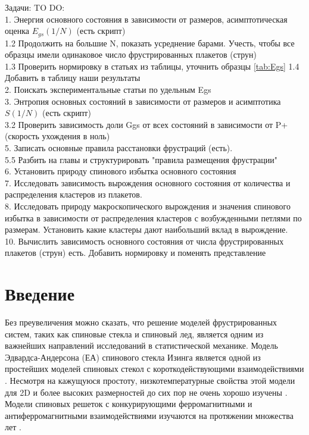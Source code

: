 \documentclass[utf8, babel, sor, jor, amsmath, amssymb, reprint]{elsarticle} %
\begin{document}
\linenumbers
\newpage
Задачи:
TO DO: \\
1. Энергия основного состояния в зависимости от размеров, асимптотическая оценка $E_{gs}(1/N)$ (есть скрипт)\\
1.2 Продолжить на большие N, показать усреднение барами. Учесть, чтобы все образцы имели одинаковое число фрустрированных плакетов (струн) \\
1.3 Проверить нормировку в статьях из таблицы, уточнить образцы \ref{tab:Egs}
1.4 Добавить в таблицу наши результаты\\
2. Поискать экспериментальные статьи по удельным Egs\\
3. Энтропия основных состояний в зависимости от размеров и асимптотика $S(1/N)$  (есть скрипт)\\
3.2 Проверить зависимость доли Ggs от всех состояний в зависимости от P+ (скорость ухождения в ноль)\\
5. Записать основные правила расстановки фрустраций (есть).\\
5.5 Разбить на главы и структурировать "правила размещения фрустрации"\\
6. Установить природу спинового избытка основного состояния \\
7. Исследовать зависимость вырождения основного состояния от количества и распределения кластеров из плакетов.\\
8. Исследовать природу макроскопического вырождения и значения спинового избытка в зависимости от распределения кластеров с возбужденными петлями по размерам. Установить какие кластеры дают наибольший вклад в вырождение. \\
10. Вычислить зависимость основного состояния от числа фрустрированных плакетов (струн) есть. Добавить нормировку и поменять представление\\
\newpage



\tableofcontents

\newpage
\section{Введение}

Без преувеличения можно сказать, что решение моделей фрустрированных систем, таких как спиновые стекла и спиновый лед, является одним из важнейших направлений исследований в статистической механике. Модель Эдвардса-Андерсона (ЕА) спинового стекла Изинга является одной из простейших моделей спиновых стекол с короткодействующими взаимодействиями \cite{edwards1975theory}. Несмотря на кажущуюся простоту, низкотемпературные свойства этой модели для 2D и более высоких размерностей до сих пор не очень хорошо изучены \cite{pal1996ground, hartmann2011ground, newman2022ground}. Модели спиновых решеток с конкурирующими ферромагнитными и антиферромагнитными взаимодействиями изучаются на протяжении множества лет \cite{binder1986spin,mezard1987spin,  lebrecht2004plaquette, valdes2012j, lebrecht2015j, fan2023searching}. 
\end{document}
